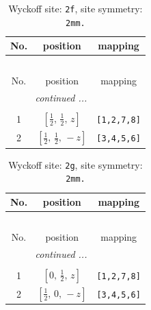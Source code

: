 \documentclass[fleqn,8pt]{jsarticle}
\begin{document}
\renewcommand{\arraystretch}{1.2}
\begin{longtable}{ccc}
\caption{Wyckoff site: {\tt 2f}, site symmetry: {\tt 2mm.}}
 \\
 \hline \hline
No. & position & mapping \\ \hline \endfirsthead

\multicolumn{2}{l}{\tablename\ \thetable{}} \\
 \hline \hline
No. & position & mapping \\ \hline \endhead

 \hline \hline
\multicolumn{2}{r}{\footnotesize\it continued ...} \\ \endfoot

 \hline \hline
\multicolumn{2}{r}{} \\ \endlastfoot

1 & $\left[ \frac{1}{2},\, \frac{1}{2},\, z \right]$ & {\tt [1,2,7,8]} \\ \hline
2 & $\left[ \frac{1}{2},\, \frac{1}{2},\, - z \right]$ & {\tt [3,4,5,6]} \\
\end{longtable}
\renewcommand{\arraystretch}{1.2}
\begin{longtable}{ccc}
\caption{Wyckoff site: {\tt 2g}, site symmetry: {\tt 2mm.}}
 \\
 \hline \hline
No. & position & mapping \\ \hline \endfirsthead

\multicolumn{2}{l}{\tablename\ \thetable{}} \\
 \hline \hline
No. & position & mapping \\ \hline \endhead

 \hline \hline
\multicolumn{2}{r}{\footnotesize\it continued ...} \\ \endfoot

 \hline \hline
\multicolumn{2}{r}{} \\ \endlastfoot

1 & $\left[ 0,\, \frac{1}{2},\, z \right]$ & {\tt [1,2,7,8]} \\ \hline
2 & $\left[ \frac{1}{2},\, 0,\, - z \right]$ & {\tt [3,4,5,6]} \\
\end{longtable}
\renewcommand{\arraystretch}{1.2}
\end{document}
